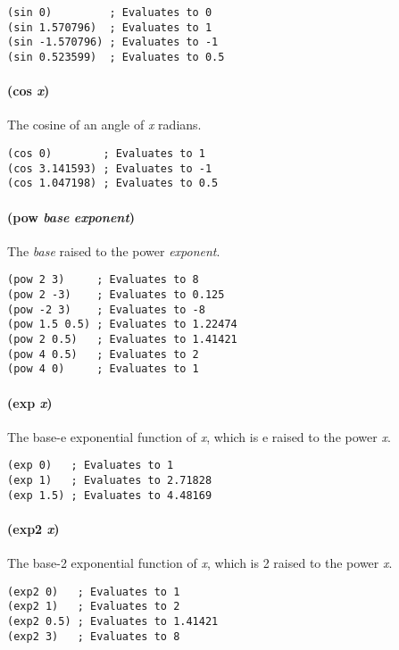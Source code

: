 \documentclass[twoside=false, numbers=noenddot]{scrbook}
\begin{document}
\begin{verbatim}
(sin 0)         ; Evaluates to 0
(sin 1.570796)  ; Evaluates to 1
(sin -1.570796) ; Evaluates to -1
(sin 0.523599)  ; Evaluates to 0.5
\end{verbatim}

\paragraph{(cos \emph{x})}
The cosine of an angle of \emph{x} radians.

\begin{verbatim}
(cos 0)        ; Evaluates to 1
(cos 3.141593) ; Evaluates to -1
(cos 1.047198) ; Evaluates to 0.5
\end{verbatim}

\paragraph{(pow \emph{base} \emph{exponent})}
The \emph{base} raised to the power \emph{exponent}.

\begin{verbatim}
(pow 2 3)     ; Evaluates to 8
(pow 2 -3)    ; Evaluates to 0.125
(pow -2 3)    ; Evaluates to -8
(pow 1.5 0.5) ; Evaluates to 1.22474
(pow 2 0.5)   ; Evaluates to 1.41421
(pow 4 0.5)   ; Evaluates to 2
(pow 4 0)     ; Evaluates to 1
\end{verbatim}

\paragraph{(exp \emph{x})}
The base-e exponential function of \emph{x}, which is e raised to the power \emph{x}.

\begin{verbatim}
(exp 0)   ; Evaluates to 1
(exp 1)   ; Evaluates to 2.71828
(exp 1.5) ; Evaluates to 4.48169
\end{verbatim}

\paragraph{(exp2 \emph{x})}
The base-2 exponential function of \emph{x}, which is 2 raised to the power \emph{x}.

\begin{verbatim}
(exp2 0)   ; Evaluates to 1
(exp2 1)   ; Evaluates to 2
(exp2 0.5) ; Evaluates to 1.41421
(exp2 3)   ; Evaluates to 8
\end{verbatim}
\end{document}
